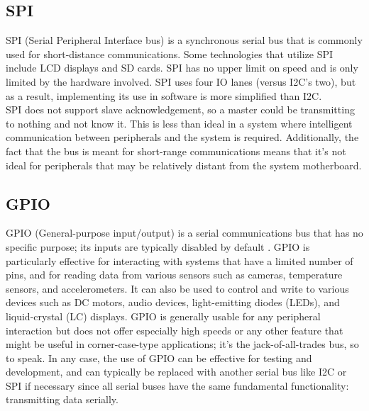 \subsection{SPI}
SPI (Serial Peripheral Interface bus) is a synchronous serial bus that is commonly used for short-distance communications. Some technologies that utilize SPI include LCD displays and SD cards. SPI has no upper limit on speed and is only limited by the hardware involved. SPI uses four IO lanes (versus I2C's two), but as a result, implementing its use in software is more simplified than I2C. \\

SPI does not support slave acknowledgement, so a master could be transmitting to nothing and not know it. This is less than ideal in a system where intelligent communication between peripherals and the system is required. Additionally, the fact that the bus is meant for short-range communications means that it's not ideal for peripherals that may be relatively distant from the system motherboard.

\subsection{GPIO}
GPIO (General-purpose input/output) is a serial communications bus that has no specific purpose; its inputs are typically disabled by default \cite{JavaME}. GPIO is particularly effective for interacting with systems that have a limited number of pins, and for reading data from various sensors such as cameras, temperature sensors, and accelerometers. It can also be used to control and write to various devices such as DC motors, audio devices, light-emitting diodes (LEDs), and liquid-crystal (LC) displays. GPIO is generally usable for any peripheral interaction but does not offer especially high speeds or any other feature that might be useful in corner-case-type applications; it's the jack-of-all-trades bus, so to speak. In any case, the use of GPIO can be effective for testing and development, and can typically be replaced with another serial bus like I2C or SPI if necessary since all serial buses have the same fundamental functionality: transmitting data serially.

